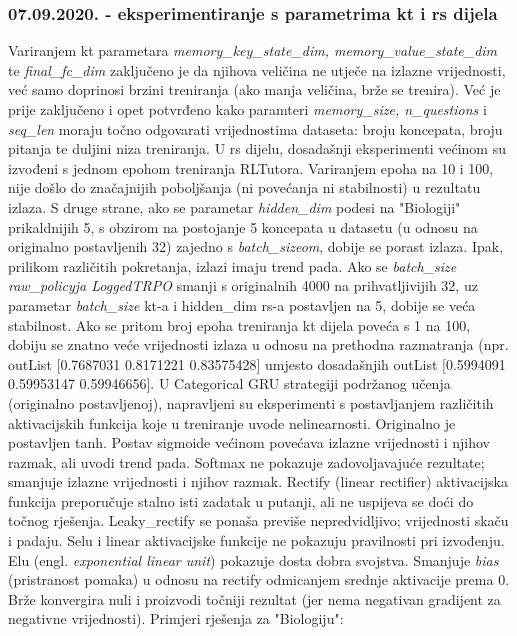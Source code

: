 \subsubsection{07.09.2020. - eksperimentiranje s parametrima kt i rs dijela}
Variranjem kt parametara \textit{memory\_key\_state\_dim, memory\_value\_state\_dim} te \textit{final\_fc\_dim} zaključeno je da njihova veličina ne utječe na izlazne vrijednosti, već samo doprinosi brzini treniranja (ako manja veličina, brže se trenira). Već je prije zaključeno i opet potvrđeno kako paramteri \textit{memory\_size, n\_questions} i \textit{seq\_len} moraju točno odgovarati vrijednostima dataseta: broju koncepata, broju pitanja te duljini niza treniranja.  \newline
U rs dijelu, dosadašnji eksperimenti većinom su izvođeni s jednom epohom treniranja RLTutora. Variranjem epoha na 10 i 100, nije došlo do značajnijih poboljšanja (ni povećanja ni stabilnosti) u rezultatu izlaza. \newline
S druge strane, ako se parametar \textit{hidden\_dim} podesi na "Biologiji" prikaldnijih 5, s obzirom na postojanje 5 koncepata u datasetu (u odnosu na originalno postavljenih 32) zajedno s \textit{batch\_sizeom}, dobije se porast izlaza. Ipak, prilikom različitih pokretanja, izlazi imaju trend pada.\newline
Ako se \textit{batch\_size raw\_policyja LoggedTRPO} smanji s originalnih 4000 na prihvatljivijih 32, uz parametar \textit{batch\_size} kt-a i {hidden\_dim} rs-a postavljen na 5, dobije se veća stabilnost. Ako se pritom broj epoha treniranja kt dijela poveća s 1 na 100, dobiju se znatno veće vrijednosti izlaza u odnosu na prethodna razmatranja (npr. \newline outList [0.7687031   0.8171221  0.83575428] \newline umjesto dosadašnjih \newline outList [0.5994091  0.59953147 0.59946656].\newline
U Categorical GRU strategiji podržanog učenja (originalno postavljenoj), napravljeni su eksperimenti s postavljanjem različitih aktivacijskih funkcija koje u treniranje uvode nelinearnosti. Originalno je postavljen tanh. Postav sigmoide većinom povećava izlazne vrijednosti i njihov razmak, ali uvodi trend pada. Softmax ne pokazuje zadovoljavajuće rezultate; smanjuje izlazne vrijednosti i njihov razmak. Rectify (linear rectifier) aktivacijska funkcija preporučuje stalno isti zadatak u putanji, ali ne uspijeva se doći do točnog rješenja. Leaky\_rectify se ponaša previše nepredvidljivo; vrijednosti skaču i padaju. Selu i linear aktivacijske funkcije ne pokazuju pravilnosti pri izvođenju. Elu (engl. \textit{exponential linear unit}) pokazuje dosta dobra svojstva. Smanjuje \textit{bias} (pristranost pomaka) u odnosu na rectify  odmicanjem srednje aktivacije prema 0. Brže konvergira nuli i proizvodi točniji rezultat (jer nema negativan gradijent za negativne vrijednosti). Primjeri rješenja za "Biologiju":\newline
